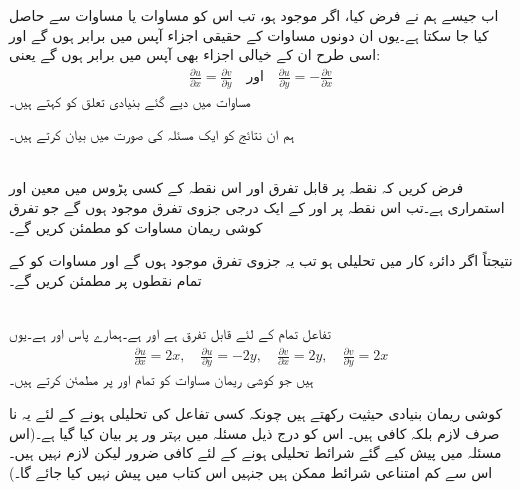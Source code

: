 اب جیسے ہم نے فرض کیا، اگر  موجود ہو، تب اس کو  مساوات  یا مساوات 
 سے حاصل کیا جا سکتا ہے۔یوں ان دونوں مساوات کے حقیقی اجزاء  آپس میں برابر ہوں گے اور اسی طرح ان کے خیالی اجزاء بھی آپس میں برابر ہوں گے یعنی:
\begin{align} \label{مساوات_مخلوط_کوشی_ریمان}
\frac{\partial u}{\partial x}=\frac{\partial v}{\partial y}\quad \text{اور}\quad \frac{\partial u}{\partial y}=-\frac{\partial v}{\partial x}
\end{align}
مساوات  میں دیے گئے بنیادی  تعلق کو  کہتے ہیں۔

ہم ان نتائج کو ایک مسئلہ کی صورت میں بیان کرتے ہیں۔

\quad {}\\
فرض کریں کہ  نقطہ  پر قابل تفرق اور اس نقطہ کے کسی پڑوس میں معین اور استمراری ہے۔تب اس نقطہ پر  اور  کے ایک درجی جزوی تفرق موجود ہوں گے  جو تفرق کوشی ریمان مساوات  کو مطمئن کریں گے۔ 

نتیجتاً اگر دائرہ کار  میں  تحلیلی ہو تب یہ جزوی تفرق موجود ہوں گے اور مساوات  کو  کے تمام نقطوں پر مطمئن کریں گے۔

\quad {}\\
تفاعل  تمام  کے لئے قابل تفرق ہے اور  ہے۔ہمارے پاس  اور  ہے۔یوں
\begin{align*}
\frac{\partial u}{\partial x}=2x,\quad \frac{\partial u}{\partial y}=-2y,\quad \frac{\partial v}{\partial x}=2y,\quad \frac{\partial v}{\partial y}=2x
\end{align*}
ہیں جو کوشی ریمان مساوات  کو تمام  اور  پر مطمئن کرتے ہیں۔

کوشی ریمان بنیادی حیثیت رکھتے ہیں چونکہ کسی تفاعل کی تحلیلی ہونے کے لئے  یہ نا صرف لازم بلکہ کافی ہیں۔ اس کو درج ذیل مسئلہ میں بہتر ور پر بیان کیا گیا ہے۔(اس مسئلہ میں پیش کیے گئے شرائط تحلیلی ہونے کے لئے کافی ضرور لیکن لازم نہیں ہیں۔اس سے کم امتناعی شرائط ممکن ہیں جنہیں اس کتاب میں پیش نہیں کیا جائے گا۔)

